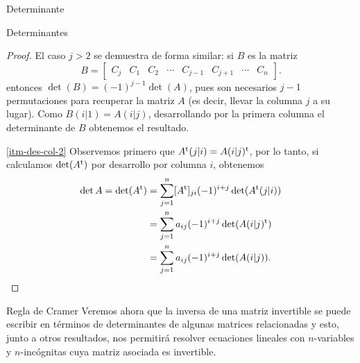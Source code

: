 \begin{chapter}{Determinante}
\begin{section}{Determinantes}
\begin{proof}
      El caso $j>2$  se demuestra de forma similar: si $B$ es la matriz
      $$
          B = \begin{bmatrix} C_j &C_1 &C_2 &\cdots& C_{j-1}&C_{j+1}&\cdots &C_n\end{bmatrix}.
      $$
      entonces $\det(B)=(-1)^{j-1}\det(A)$, pues son necesarios $j-1$ permutaciones para recuperar la matriz $A$ (es decir, llevar la columna $j$ a su lugar).
      Como $B(i|1) = A(i|j)$,  desarrollando por la primera columna el determinante de $B$ obtenemos el resultado.


      \ref{itm-des-col-2} Observemos primero que $A^{\operatorname{t}}(j|i) = A(i|j)^{\operatorname{t}}$, por lo tanto, si calculamos $\det(A^{\operatorname{t}})$ por desarrollo por columna $i$, obtenemos
      \begin{align*}
          \det A = \det(A^{\operatorname{t}}) & =\sum_{j=1}^{n} [A^{\operatorname{t}}]_{ji} (-1)^{i+j}\det (A^{\operatorname{t}}(j|i)) \\
                              & =  \sum_{j=1}^{n} a_{ij} (-1)^{i+j}\det (A(i|j)^{\operatorname{t}})    \\
                              & = \sum_{j=1}^{n} a_{ij} (-1)^{i+j}\det (A(i|j)).
      \end{align*}
  \end{proof}

 \end{section}

 \begin{section}{Regla de Cramer}\label{seccion-regla-de-cramer} Veremos ahora que la inversa de una matriz invertible se puede escribir en términos de determinantes de algunas matrices relacionadas y esto, junto a otros resultados, nos permitirá resolver ecuaciones lineales con $n$-variables y $n$-incógnitas cuya matriz asociada es invertible.


\end{section}
\end{chapter}
